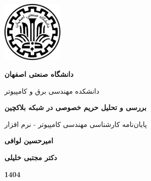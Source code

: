 \documentclass[12pt, a4paper]{report}
\begin{document}
	\begin{center}
		\includegraphics[height=3cm]{iut_logo.png}
		\vspace{0.4cm}
		
		\textbf{دانشگاه صنعتی اصفهان}\\
		\vspace{0.4cm}
		
		{\large
			
			دانشکده مهندسی برق و کامپیوتر
		}
		\vspace{2cm}
		
		{\Large
			\textbf{بررسی و تحلیل حریم خصوصی در شبکه بلاکچین}\\
		}
		\vspace{3cm}
		
		{\Large
			پایان‌نامه کارشناسی مهندسی کامپیوتر - نرم افزار\\
		}
		\vspace{1cm}
		
		{\large
			\textbf{امیرحسین لوافی}\\
		}
		\vspace{3cm}
		
		{\large

		}
		\vspace{0.5cm}
		
		{\large
			\textbf{دکتر مجتبی خلیلی}\\
		}
		\vspace{1cm}
		
		\textbf{1404}
		
	\end{center}

	\pagebreak




	\tableofcontents
	\newpage
	
	
	 
	 
	
	
	
	
	 
	 
	
	
	\printbibliography[title={منابع}]
	
	

	
\end{document}
